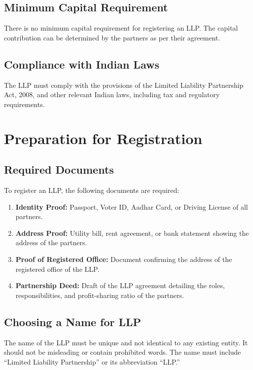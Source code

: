 \documentclass[a4paper,12pt]{report}
\begin{document}
\section{Minimum Capital Requirement}
There is no minimum capital requirement for registering an LLP. The capital contribution can be determined by the partners as per their agreement.

\section{Compliance with Indian Laws}
The LLP must comply with the provisions of the Limited Liability Partnership Act, 2008, and other relevant Indian laws, including tax and regulatory requirements.

\chapter{Preparation for Registration}
\section{Required Documents}
To register an LLP, the following documents are required:
\begin{enumerate}
    \item \textbf{Identity Proof:} Passport, Voter ID, Aadhar Card, or Driving License of all partners.
    \item \textbf{Address Proof:} Utility bill, rent agreement, or bank statement showing the address of the partners.
    \item \textbf{Proof of Registered Office:} Document confirming the address of the registered office of the LLP.
    \item \textbf{Partnership Deed:} Draft of the LLP agreement detailing the roles, responsibilities, and profit-sharing ratio of the partners.
\end{enumerate}

\section{Choosing a Name for LLP}
The name of the LLP must be unique and not identical to any existing entity. It should not be misleading or contain prohibited words. The name must include “Limited Liability Partnership” or its abbreviation “LLP.”
\end{document}
